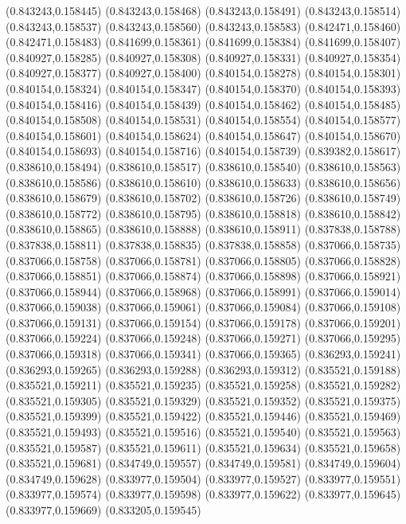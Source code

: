(0.843243,0.158445)
(0.843243,0.158468)
(0.843243,0.158491)
(0.843243,0.158514)
(0.843243,0.158537)
(0.843243,0.158560)
(0.843243,0.158583)
(0.842471,0.158460)
(0.842471,0.158483)
(0.841699,0.158361)
(0.841699,0.158384)
(0.841699,0.158407)
(0.840927,0.158285)
(0.840927,0.158308)
(0.840927,0.158331)
(0.840927,0.158354)
(0.840927,0.158377)
(0.840927,0.158400)
(0.840154,0.158278)
(0.840154,0.158301)
(0.840154,0.158324)
(0.840154,0.158347)
(0.840154,0.158370)
(0.840154,0.158393)
(0.840154,0.158416)
(0.840154,0.158439)
(0.840154,0.158462)
(0.840154,0.158485)
(0.840154,0.158508)
(0.840154,0.158531)
(0.840154,0.158554)
(0.840154,0.158577)
(0.840154,0.158601)
(0.840154,0.158624)
(0.840154,0.158647)
(0.840154,0.158670)
(0.840154,0.158693)
(0.840154,0.158716)
(0.840154,0.158739)
(0.839382,0.158617)
(0.838610,0.158494)
(0.838610,0.158517)
(0.838610,0.158540)
(0.838610,0.158563)
(0.838610,0.158586)
(0.838610,0.158610)
(0.838610,0.158633)
(0.838610,0.158656)
(0.838610,0.158679)
(0.838610,0.158702)
(0.838610,0.158726)
(0.838610,0.158749)
(0.838610,0.158772)
(0.838610,0.158795)
(0.838610,0.158818)
(0.838610,0.158842)
(0.838610,0.158865)
(0.838610,0.158888)
(0.838610,0.158911)
(0.837838,0.158788)
(0.837838,0.158811)
(0.837838,0.158835)
(0.837838,0.158858)
(0.837066,0.158735)
(0.837066,0.158758)
(0.837066,0.158781)
(0.837066,0.158805)
(0.837066,0.158828)
(0.837066,0.158851)
(0.837066,0.158874)
(0.837066,0.158898)
(0.837066,0.158921)
(0.837066,0.158944)
(0.837066,0.158968)
(0.837066,0.158991)
(0.837066,0.159014)
(0.837066,0.159038)
(0.837066,0.159061)
(0.837066,0.159084)
(0.837066,0.159108)
(0.837066,0.159131)
(0.837066,0.159154)
(0.837066,0.159178)
(0.837066,0.159201)
(0.837066,0.159224)
(0.837066,0.159248)
(0.837066,0.159271)
(0.837066,0.159295)
(0.837066,0.159318)
(0.837066,0.159341)
(0.837066,0.159365)
(0.836293,0.159241)
(0.836293,0.159265)
(0.836293,0.159288)
(0.836293,0.159312)
(0.835521,0.159188)
(0.835521,0.159211)
(0.835521,0.159235)
(0.835521,0.159258)
(0.835521,0.159282)
(0.835521,0.159305)
(0.835521,0.159329)
(0.835521,0.159352)
(0.835521,0.159375)
(0.835521,0.159399)
(0.835521,0.159422)
(0.835521,0.159446)
(0.835521,0.159469)
(0.835521,0.159493)
(0.835521,0.159516)
(0.835521,0.159540)
(0.835521,0.159563)
(0.835521,0.159587)
(0.835521,0.159611)
(0.835521,0.159634)
(0.835521,0.159658)
(0.835521,0.159681)
(0.834749,0.159557)
(0.834749,0.159581)
(0.834749,0.159604)
(0.834749,0.159628)
(0.833977,0.159504)
(0.833977,0.159527)
(0.833977,0.159551)
(0.833977,0.159574)
(0.833977,0.159598)
(0.833977,0.159622)
(0.833977,0.159645)
(0.833977,0.159669)
(0.833205,0.159545)
